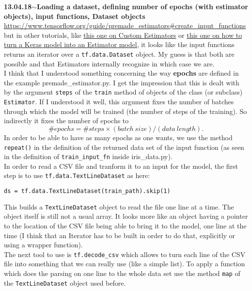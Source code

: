 \documentclass[11pt,a4paper]{article}
\newenvironment{loggentry}[2]%
{\noindent\textbf{#1}\hspace{1cm}$\mathbf{\sim}$\text{ }\textbf{#2}\\}{\vspace{0.5cm}}
\begin{document}
\begin{loggentry}{13.04.18}{Loading a dataset, defining number of epochs (with estimator objects), input functions, Dataset objects}
\url{https://www.tensorflow.org/guide/premade_estimators#create_input_functions}\\
but in other tutorials, like \href{https://www.tensorflow.org/guide/custom_estimators#write_an_input_function}{this one on Custom Estimators} or \href{https://www.dlology.com/blog/an-easy-guide-to-build-new-tensorflow-datasets-and-estimator-with-keras-model/}{this one on how to turn a Keras model into an Estimator model}, it looks like the input functions returns an iterator over a \texttt{tf.data.Dataset} object. My guess is that both are possible and that Estimators internally recognize in which case we are.\\


I think that I understood something concerning the way \textbf{epochs} are defined in the example premade\_estimator.py. I get the impression that this is dealt with by the argument \texttt{steps} of the \texttt{train} method of objects of the class (or subclass) \texttt{Estimator}. If I understood it well, this argument fixes the number of batches through which the model will be trained (the number of steps of the training). So indirectly it fixes the number of epochs to
$$
\# epochs = \# steps \times (batch\ size)/(data\ length).
$$
In order to be able to have as many epochs as one wants, we use the method \texttt{repeat()} in the definition of the returned data set of the input function (as seen in the definition of \texttt{train\_input\_fn} inside iris\_data.py).\\
In order to read a CSV file and tranform it to an input for the model, the first step is to use \texttt{tf.data.TextLineDataset} as here:\\
\begin{verbatim}
ds = tf.data.TextLineDataset(train_path).skip(1)
\end{verbatim}
This builds a \texttt{TextLineDataset} object to read the file one line at a time. The object itself is still not a usual array. It looks more like an object having a pointer to the location of the CSV file being able to bring it to the model, one line at the time (I think that an Iterator has to be built in order to do that, explicitly or using a wrapper function).\\
The next tool to use is \texttt{tf.decode\_csv} which allows to turn each line of the CSV file into something that we can really use (like a simple list). To apply a function which does the parsing on one line to the whole data set use the method \texttt{map} of the \texttt{TextLineDataset} object used before.\\


\end{loggentry}
\end{document}
